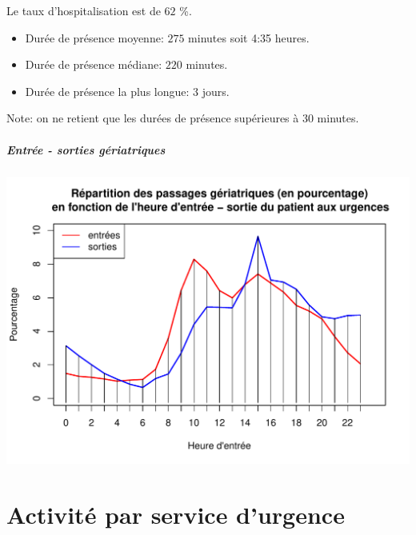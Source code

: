 \documentclass[12pt,english,french,twoside]{book}\usepackage[]{graphicx}\usepackage[]{color}
\makeatletter
\def\maxwidth{ %
  \ifdim\Gin@nat@width>\linewidth
    \linewidth
  \else
    \Gin@nat@width
  \fi
}
\newenvironment{knitrout}{}{} %
\makeatother
\begin{document}
Le taux d'hospitalisation est de $62$ \%.





\begin{itemize}
  \item Durée de présence moyenne: $275$ minutes soit 4:35 heures.
  \item Durée de présence médiane: $220$ minutes.
  \item Durée de présence la plus longue: $3$ jours.
\end{itemize}

Note: on ne retient que les durées de présence supérieures à 30 minutes.

\subsubsection*{Entrée - sorties gériatriques}

\begin{knitrout}
\color{fgcolor}
\includegraphics[width=\maxwidth]{figure/es_geriatriques} 

\end{knitrout}





\part{Activité par service d'urgence}
\label{partie4}
\end{document}
